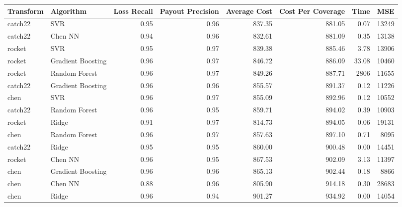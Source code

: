 \begin{tabular}{llrrrrrr}
\toprule
Transform &         Algorithm &  Loss Recall &  Payout Precision &  Average Cost &  Cost Per Coverage &    Time &      MSE \\
\midrule
  catch22 &               SVR &         0.95 &              0.96 &        837.35 &             881.05 &    0.07 & 13249 \\
  catch22 &           Chen NN &         0.94 &              0.96 &        832.61 &             881.09 &    0.35 & 13138 \\
   rocket &               SVR &         0.95 &              0.97 &        839.38 &             885.46 &    3.78 & 13906 \\
   rocket & Gradient Boosting &         0.96 &              0.97 &        846.72 &             886.09 &   33.08 & 10460 \\
   rocket &     Random Forest &         0.96 &              0.97 &        849.26 &             887.71 & 2806 & 11655 \\
  catch22 & Gradient Boosting &         0.96 &              0.96 &        855.57 &             891.37 &    0.12 & 11226 \\
     chen &               SVR &         0.96 &              0.97 &        855.09 &             892.96 &    0.12 & 10552 \\
  catch22 &     Random Forest &         0.96 &              0.95 &        859.71 &             894.02 &    0.39 & 10903 \\
   rocket &             Ridge &         0.91 &              0.97 &        814.73 &             894.05 &    0.06 & 19131 \\
     chen &     Random Forest &         0.96 &              0.97 &        857.63 &             897.10 &    0.71 &  8095 \\
  catch22 &             Ridge &         0.95 &              0.95 &        860.00 &             900.48 &    0.00 & 14451 \\
   rocket &           Chen NN &         0.96 &              0.95 &        867.53 &             902.09 &    3.13 & 11397 \\
     chen & Gradient Boosting &         0.96 &              0.96 &        865.13 &             902.44 &    0.18 &  8866 \\
     chen &           Chen NN &         0.88 &              0.96 &        805.90 &             914.18 &    0.30 & 28683 \\
     chen &             Ridge &         0.96 &              0.94 &        901.27 &             934.92 &    0.00 & 14054 \\
\bottomrule
\end{tabular}
